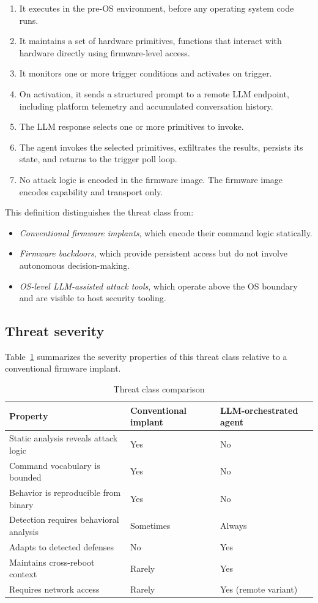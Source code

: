 \documentclass[11pt,a4paper]{article}
\begin{document}
\begin{enumerate}[noitemsep]
\item It executes in the pre-OS environment, before any operating system code runs.
\item It maintains a set of hardware primitives, functions that interact with hardware directly using firmware-level access.
\item It monitors one or more trigger conditions and activates on trigger.
\item On activation, it sends a structured prompt to a remote LLM endpoint, including platform telemetry and accumulated conversation history.
\item The LLM response selects one or more primitives to invoke.
\item The agent invokes the selected primitives, exfiltrates the results, persists its state, and returns to the trigger poll loop.
\item No attack logic is encoded in the firmware image. The firmware image encodes capability and transport only.
\end{enumerate}

This definition distinguishes the threat class from:

\begin{itemize}[noitemsep]
\item \textit{Conventional firmware implants}, which encode their command logic statically.
\item \textit{Firmware backdoors}, which provide persistent access but do not involve autonomous decision-making.
\item \textit{OS-level LLM-assisted attack tools}, which operate above the OS boundary and are visible to host security tooling.
\end{itemize}

\subsection{Threat severity}

Table~\ref{tab:severity} summarizes the severity properties of this threat class relative to a conventional firmware implant.

\begin{table}[h]
\centering
\begin{tabular}{lll}
\toprule
Property & Conventional implant & LLM-orchestrated agent \\
\midrule
Static analysis reveals attack logic & Yes & No \\
Command vocabulary is bounded & Yes & No \\
Behavior is reproducible from binary & Yes & No \\
Detection requires behavioral analysis & Sometimes & Always \\
Adapts to detected defenses & No & Yes \\
Maintains cross-reboot context & Rarely & Yes \\
Requires network access & Rarely & Yes (remote variant) \\
\bottomrule
\end{tabular}
\caption{Threat class comparison}
\label{tab:severity}
\end{table}
\end{document}
